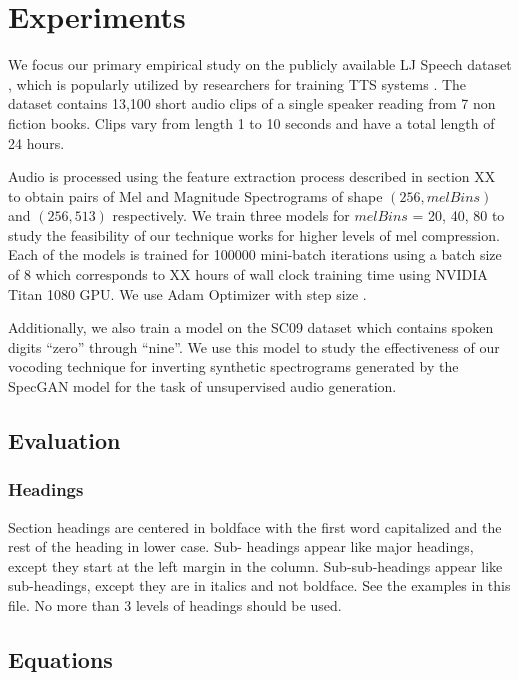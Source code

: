 \documentclass[a4paper]{article}
\begin{document}
\section{Experiments}
We focus our primary empirical study on the publicly available LJ Speech dataset \cite{ljspeech}, which is popularly utilized by researchers for training TTS systems \cite{waveglow,r9y9}. The dataset contains 13,100 short audio clips of a single speaker reading from 7 non fiction books. Clips vary from length 1 to 10 seconds and have a total length of 24 hours.

Audio is processed using the feature extraction process described in section XX to obtain pairs of Mel and Magnitude Spectrograms of shape $(256, \mathit{melBins})$ and $(256, 513)$ respectively. We train three models for $\mathit{melBins}$ = 20, 40, 80 to study the feasibility of our technique works for higher levels of mel compression. Each of the models is trained for 100000 mini-batch iterations using a batch size of 8 which corresponds to XX hours of wall clock training time using NVIDIA Titan 1080 GPU. We use Adam Optimizer with step size . 

Additionally, we also train a model on the SC09 dataset \cite{donahue2019wavegan} which contains spoken digits ``zero'' through ``nine''. We use this model to study the effectiveness of our vocoding technique for inverting synthetic spectrograms generated by the SpecGAN model \cite{donahue2019wavegan} for the task of unsupervised audio generation.

\subsection{Evaluation}


\subsubsection{Headings}

Section headings are centered in boldface with the first word capitalized and the rest of the heading in lower case. Sub- headings appear like major headings, except they start at the left margin in the column. Sub-sub-headings appear like sub-headings, except they are in italics and not boldface. See the examples in this file. No more than 3 levels of headings should be used.

\subsection{Equations}
\end{document}
